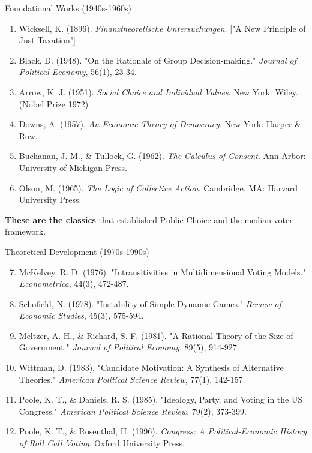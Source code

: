 \documentclass[10pt]{beamer}
\begin{document}
\begin{frame}{Foundational Works (1940s-1960s)}
\footnotesize
\begin{enumerate}
\item Wicksell, K. (1896). \emph{Finanztheoretische Untersuchungen}. ["A New Principle of Just Taxation"]
\item Black, D. (1948). "On the Rationale of Group Decision-making." \emph{Journal of Political Economy}, 56(1), 23-34.
\item Arrow, K. J. (1951). \emph{Social Choice and Individual Values}. New York: Wiley. (Nobel Prize 1972)
\item Downs, A. (1957). \emph{An Economic Theory of Democracy}. New York: Harper \& Row.
\item Buchanan, J. M., \& Tullock, G. (1962). \emph{The Calculus of Consent}. Ann Arbor: University of Michigan Press.
\item Olson, M. (1965). \emph{The Logic of Collective Action}. Cambridge, MA: Harvard University Press.
\end{enumerate}


\textbf{These are the classics} that established Public Choice and the median voter framework.
\end{frame}

\begin{frame}{Theoretical Development (1970s-1990s)}
\footnotesize
\begin{enumerate}
\setcounter{enumi}{6}
\item McKelvey, R. D. (1976). "Intransitivities in Multidimensional Voting Models." \emph{Econometrica}, 44(3), 472-487.
\item Schofield, N. (1978). "Instability of Simple Dynamic Games." \emph{Review of Economic Studies}, 45(3), 575-594.
\item Meltzer, A. H., \& Richard, S. F. (1981). "A Rational Theory of the Size of Government." \emph{Journal of Political Economy}, 89(5), 914-927.
\item Wittman, D. (1983). "Candidate Motivation: A Synthesis of Alternative Theories." \emph{American Political Science Review}, 77(1), 142-157.
\item Poole, K. T., \& Daniels, R. S. (1985). "Ideology, Party, and Voting in the US Congress." \emph{American Political Science Review}, 79(2), 373-399.
\item Poole, K. T., \& Rosenthal, H. (1996). \emph{Congress: A Political-Economic History of Roll Call Voting}. Oxford University Press.
\end{enumerate}
\end{frame}
\end{document}
